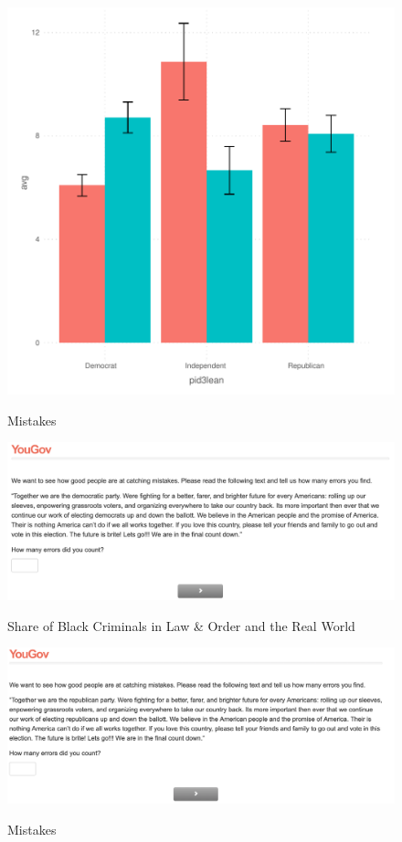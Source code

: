 \documentclass[12pt, letterpaper]{article}
\begin{document}




\begin{figure}[!htbp]
\centering
\caption{Mistakes}
\includegraphics[scale=.6]{../figs/parking.pdf}
\label{fig:mistakes_rep}
\end{figure}


\clearpage



\begin{figure}[!htbp]
\centering
\caption{Share of Black Criminals in Law \& Order and the Real World}
\includegraphics[scale=.4]{../data/treats/Mistakes_Dem.png}
\label{fig:mistakes_dem}
\end{figure}

\begin{figure}[!htbp]
\centering
\caption{Mistakes}
\includegraphics[scale=.4]{../data/treats/Mistakes_Rep.png}
\label{fig:mistakes_rep}
\end{figure}
\end{document}
